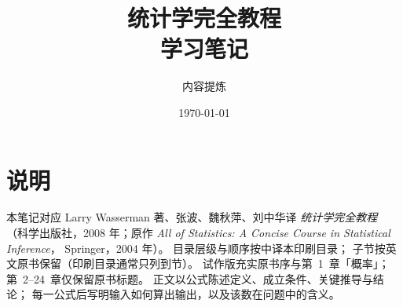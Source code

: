 \documentclass[UTF8,zihao=-4,openany]{ctexbook}
\title{\heiti 统计学完全教程\\[0.4em]\Large 学习笔记}
\author{内容提炼}
\date{\today}
\begin{document}
\maketitle
\frontmatter

\chapter*{说明}
本笔记对应 Larry Wasserman 著、张波、魏秋萍、刘中华译
\emph{统计学完全教程}
（科学出版社，2008 年；原作
\emph{All of Statistics: A Concise Course in Statistical Inference}，
Springer，2004 年）。
目录层级与顺序按中译本印刷目录；
子节按英文原书保留（印刷目录通常只列到节）。
试作版充实原书序与第~1~章「概率」；
第~2--24~章仅保留原书标题。
正文以公式陈述定义、成立条件、关键推导与结论；
每一公式后写明输入如何算出输出，以及该数在问题中的含义。

\hypertarget{contents}{}
\tableofcontents

\mainmatter

























\end{document}
